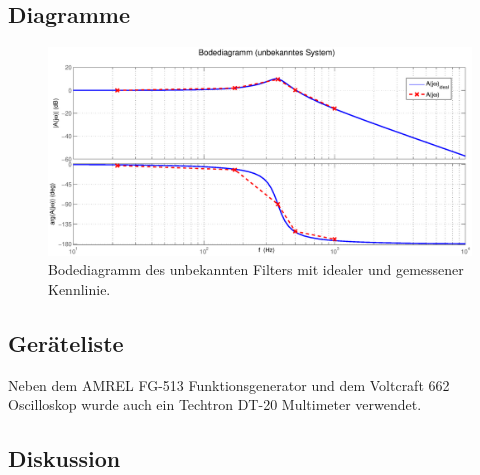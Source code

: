 \documentclass[12pt,a4paper,ngerman]{article}
\begin{document}
\subsection{Diagramme}
\begin{figure}[H]
\centering
\includegraphics[width=1.2\textwidth]{figures/bode_unbekannt.eps} 
\caption{Bodediagramm des unbekannten Filters mit idealer und gemessener Kennlinie.}
\label{fig:bode_unb}
\end{figure}


\subsection{Geräteliste}
Neben dem AMREL FG-513 Funktionsgenerator und dem Voltcraft 662 Oscilloskop wurde auch ein Techtron DT-20 Multimeter verwendet.
\subsection{Diskussion}
\end{document}
